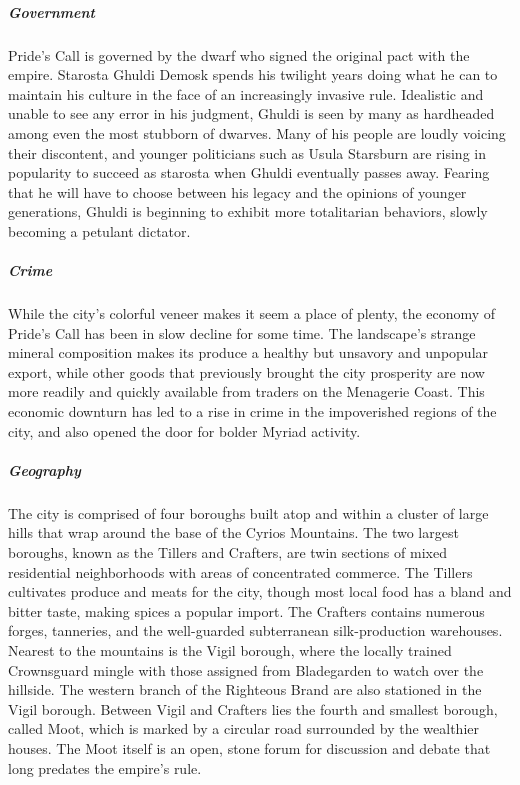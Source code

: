 \documentclass[10pt,a4paper,twoside,bg=print,twocolumn,openany,nodeprecatedcode]{dndbook}
\begin{document}
\subparagraph{Government}
Pride's Call is governed by the dwarf who signed the original pact with the empire. Starosta Ghuldi Demosk spends his twilight years doing what he can to maintain his culture in the face of an increasingly invasive rule. Idealistic and unable to see any error in his judgment, Ghuldi is seen by many as hardheaded among even the most stubborn of dwarves. Many of his people are loudly voicing their discontent, and younger politicians such as Usula Starsburn are rising in popularity to succeed as starosta when Ghuldi eventually passes away. Fearing that he will have to choose between his legacy and the opinions of younger generations, Ghuldi is beginning to exhibit more totalitarian behaviors, slowly becoming a petulant dictator.

\subparagraph{Crime}
While the city's colorful veneer makes it seem a place of plenty, the economy of Pride's Call has been in slow decline for some time. The landscape's strange mineral composition makes its produce a healthy but unsavory and unpopular export, while other goods that previously brought the city prosperity are now more readily and quickly available from traders on the Menagerie Coast. This economic downturn has led to a rise in crime in the impoverished regions of the city, and also opened the door for bolder Myriad activity.

\subparagraph{Geography}
The city is comprised of four boroughs built atop and within a cluster of large hills that wrap around the base of the Cyrios Mountains. The two largest boroughs, known as the Tillers and Crafters, are twin sections of mixed residential neighborhoods with areas of concentrated commerce. The Tillers cultivates produce and meats for the city, though most local food has a bland and bitter taste, making spices a popular import. The Crafters contains numerous forges, tanneries, and the well-guarded subterranean silk-production warehouses. Nearest to the mountains is the Vigil borough, where the locally trained Crownsguard mingle with those assigned from Bladegarden to watch over the hillside. The western branch of the Righteous Brand are also stationed in the Vigil borough. Between Vigil and Crafters lies the fourth and smallest borough, called Moot, which is marked by a circular road surrounded by the wealthier houses. The Moot itself is an open, stone forum for discussion and debate that long predates the empire's rule.
\end{document}
